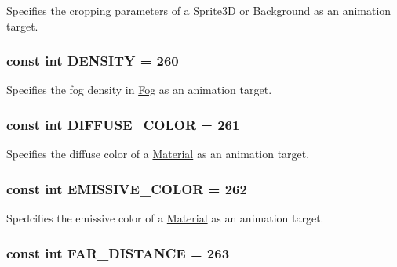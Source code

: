 Specifies the cropping parameters of a \hyperlink{classm3g_1_1Sprite3D}{Sprite3D} or \hyperlink{classm3g_1_1Background}{Background} as an animation target. \hypertarget{classm3g_1_1AnimationTrack_7d0fe4463930d4a4b24fc47660561899}{
\subsubsection[{DENSITY}]{\setlength{\rightskip}{0pt plus 5cm}const int {\bf DENSITY} = 260}}
\label{classm3g_1_1AnimationTrack_7d0fe4463930d4a4b24fc47660561899}


Specifies the fog density in \hyperlink{classm3g_1_1Fog}{Fog} as an animation target. \hypertarget{classm3g_1_1AnimationTrack_9631242a611cf95d697c25064dba7c4f}{
\subsubsection[{DIFFUSE\_\-COLOR}]{\setlength{\rightskip}{0pt plus 5cm}const int {\bf DIFFUSE\_\-COLOR} = 261}}
\label{classm3g_1_1AnimationTrack_9631242a611cf95d697c25064dba7c4f}


Specifies the diffuse color of a \hyperlink{classm3g_1_1Material}{Material} as an animation target. \hypertarget{classm3g_1_1AnimationTrack_893461d45d084e5db05b159068f945d0}{
\subsubsection[{EMISSIVE\_\-COLOR}]{\setlength{\rightskip}{0pt plus 5cm}const int {\bf EMISSIVE\_\-COLOR} = 262}}
\label{classm3g_1_1AnimationTrack_893461d45d084e5db05b159068f945d0}


Spedcifies the emissive color of a \hyperlink{classm3g_1_1Material}{Material} as an animation target. \hypertarget{classm3g_1_1AnimationTrack_86457ec0a2799f1f2d7ea8173a644de8}{
\subsubsection[{FAR\_\-DISTANCE}]{\setlength{\rightskip}{0pt plus 5cm}const int {\bf FAR\_\-DISTANCE} = 263}}
\label{classm3g_1_1AnimationTrack_86457ec0a2799f1f2d7ea8173a644de8}


